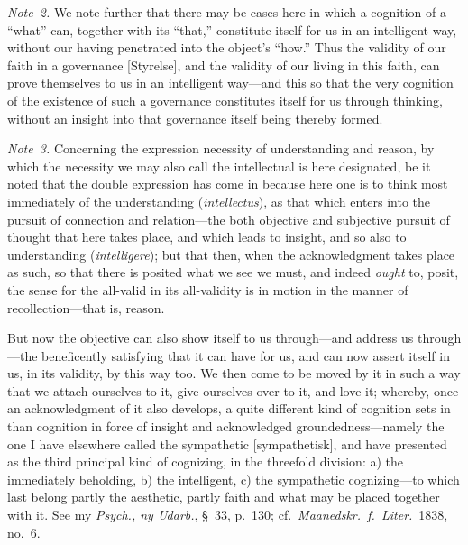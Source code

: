 \documentclass[12pt,a4paper]{book}
\begin{document}
{\small\emph{Note~2.} We note further that there may be cases here in which a
cognition of a ``what'' can, together with its ``that,'' constitute itself for us
in an intelligent way, without our having penetrated into the object's ``how.''
Thus the validity of our faith in a governance [Styrelse], and the validity of
our living in this faith, can prove themselves to us in an intelligent way---and
this so that the very cognition of the existence of such a governance constitutes
itself for us through thinking, without an insight into that governance itself
being thereby formed.\par}

{\small\emph{Note~3.} Concerning the expression necessity of understanding and
reason, by which the necessity we may also call the intellectual is here
designated, be it noted that the double expression has come in because here one
is to think most immediately of the understanding (\textit{intellectus}), as that
which enters into the pursuit of connection and relation---the both objective and
subjective pursuit of thought that here takes place, and which leads to insight,
and so also to understanding (\textit{intelligere}); but that then, when the
acknowledgment takes place as such, so that there is posited what we see we must,
and indeed \emph{ought} to, posit, the sense for the all-valid in its all-validity
is in motion in the manner of recollection---that is, reason.\par}

But now the objective can also show itself to us through---and address us
through---the beneficently satisfying that it can have for us, and can now assert
itself in us, in its validity, by this way too. We then come to be moved by it in
such a way that we attach ourselves to it, give ourselves over to it, and love it;
whereby, once an acknowledgment of it also develops, a quite different kind of
cognition sets in than cognition in force of insight and acknowledged
groundedness---namely the one I have elsewhere called the sympathetic
[sympathetisk], and have presented as the third principal kind of cognizing, in
the threefold division: a) the immediately beholding, b) the intelligent, c) the
sympathetic cognizing---to which last belong partly the aesthetic, partly faith
and what may be placed together with it. See my \textit{Psych., ny Udarb.}, \S~33,
p.~130; cf.\ \textit{Maanedskr.\ f.\ Liter.}\ 1838, no.~6.
\end{document}
